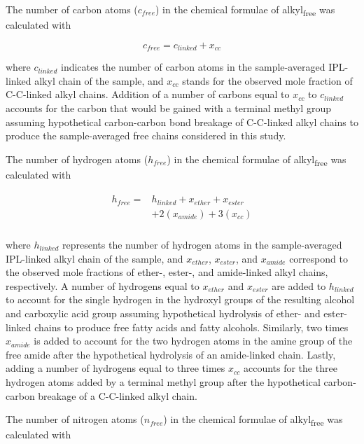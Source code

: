The number of carbon atoms ($c_{free}$) in the chemical formulae of alkyl\textsubscript{free} was calculated with

\begin{equation}
    c_{free} = c_{linked} + x_{cc}
\end{equation}

\noindent where $c_{linked}$ indicates the number of carbon atoms in the sample-averaged IPL-linked alkyl chain of the sample, and $x_{cc}$ stands for the observed mole fraction of C-C-linked alkyl chains. Addition of a number of carbons equal to $x_{cc}$ to $c_{linked}$ accounts for the carbon that would be gained with a terminal methyl group assuming hypothetical carbon-carbon bond breakage of C-C-linked alkyl chains to produce the sample-averaged free chains considered in this study.

The number of hydrogen atoms ($h_{free}$) in the chemical formulae of alkyl\textsubscript{free} was calculated with

\begin{align}
\begin{split}
    h_{free} = &h_{linked} + x_{ether} + x_{ester}\\
        & + 2(x_{amide}) + 3(x_{cc}) \\
\end{split}
\end{align}

\noindent where $h_{linked}$ represents the number of hydrogen atoms in the sample-averaged IPL-linked alkyl chain of the sample, and $x_{ether}$, $x_{ester}$, and $x_{amide}$ correspond to the observed mole fractions of ether-, ester-, and amide-linked alkyl chains, respectively. A number of hydrogens equal to $x_{ether}$ and $x_{ester}$ are added to $h_{linked}$ to account for the single hydrogen in the hydroxyl groups of the resulting alcohol and carboxylic acid group assuming hypothetical hydrolysis of ether- and ester-linked chains to produce free fatty acids and fatty alcohols. Similarly, two times $x_{amide}$ is added to account for the two hydrogen atoms in the amine group of the free amide after the hypothetical hydrolysis of an amide-linked chain. Lastly, adding a number of hydrogens equal to three times $x_{cc}$ accounts for the three hydrogen atoms added by a terminal methyl group after the hypothetical carbon-carbon breakage of a C-C-linked alkyl chain.

The number of nitrogen atoms ($n_{free}$) in the chemical formulae of alkyl\textsubscript{free} was calculated with

